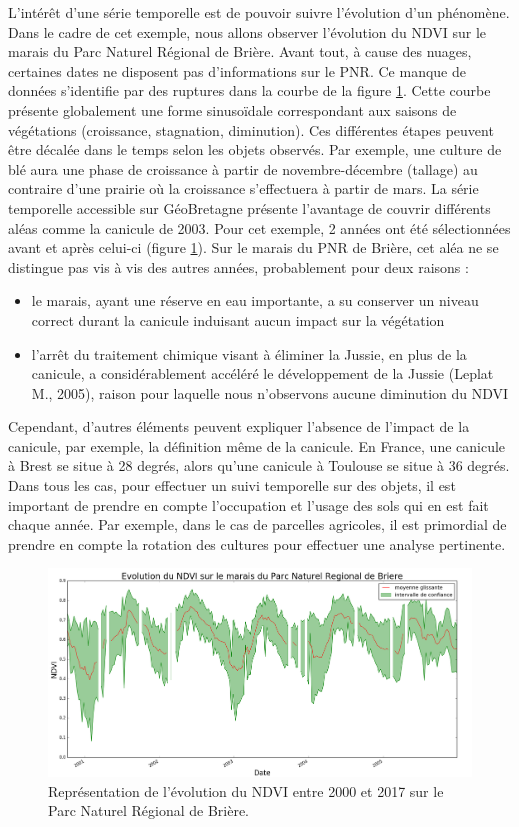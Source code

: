 \documentclass[10pt,a4paper]{article}
\begin{document}
L'intérêt d'une série temporelle est de pouvoir suivre l'évolution d'un phénomène. Dans le cadre de cet exemple, nous allons observer l'évolution du NDVI sur le marais du Parc Naturel Régional de Brière. Avant tout, à cause des nuages, certaines dates ne disposent pas d'informations sur le PNR. Ce manque de données s'identifie par des ruptures dans la courbe de la figure \ref{TS_NDVI}.\smallbreak
Cette courbe présente globalement une forme sinusoïdale correspondant aux saisons de végétations (croissance, stagnation, diminution). Ces différentes étapes peuvent être décalée dans le temps selon les objets observés. Par exemple, une culture de blé aura une phase de croissance à partir de novembre-décembre (tallage) au contraire d'une prairie où la croissance s'effectuera à partir de mars.\smallbreak
La série temporelle accessible sur GéoBretagne présente l'avantage de couvrir différents aléas comme la canicule de 2003. Pour cet exemple, 2 années ont été sélectionnées avant et après celui-ci (figure \ref{TS_NDVI}).\smallbreak
Sur le marais du PNR de Brière, cet aléa ne se distingue pas vis à vis des autres années, probablement pour deux raisons :
\begin{itemize}
\item le marais, ayant une réserve en eau importante, a su conserver un niveau correct durant la canicule induisant aucun impact sur la végétation
\item l'arrêt du traitement chimique visant à éliminer la Jussie, en plus de la canicule, a considérablement accéléré le développement de la Jussie (Leplat M., 2005), raison pour laquelle nous n'observons aucune diminution du NDVI
\end{itemize}
Cependant, d'autres éléments peuvent expliquer l'absence de l'impact de la canicule, par exemple, la définition même de la canicule. En France, une canicule à Brest se situe à 28 degrés, alors qu'une canicule à Toulouse se situe à 36 degrés.\smallbreak
Dans tous les cas, pour effectuer un suivi temporelle sur des objets, il est important de prendre en compte l'occupation et l'usage des sols qui en est fait chaque année. Par exemple, dans le cas de parcelles agricoles, il est primordial de prendre en compte la rotation des cultures pour effectuer une analyse pertinente.

\begin{figure}[!h]
\centering
\includegraphics[scale=0.29]{img/NDVI_Briere.png}
\caption{Représentation de l'évolution du NDVI entre 2000 et 2017 sur le Parc Naturel Régional de Brière.}
\label{TS_NDVI}
\end{figure}
\end{document}
